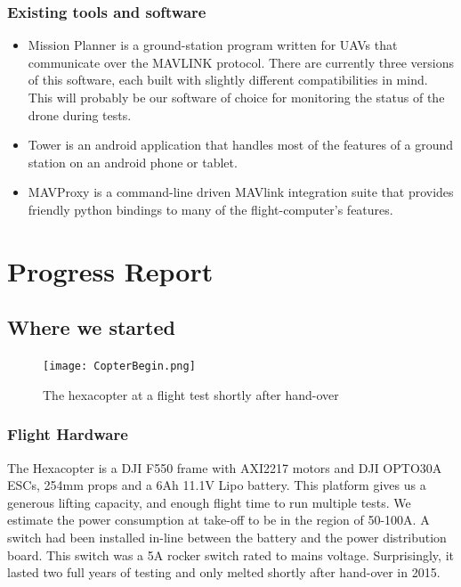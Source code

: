 \documentclass[a4paper, 11pt, titlepage]{article}
\begin{document}
    \subsubsection{Existing tools and software}
    \begin{itemize}
      \item Mission Planner\cite{MPlanner} is a ground-station program written for UAVs that communicate over the MAVLINK protocol.  There are currently three versions of this software, each built with slightly different compatibilities in mind.  This will probably be our software of choice for monitoring the status of the drone during tests.
      \item Tower \cite{3dr-tower} is an android application that handles most of the features of a ground station on an android phone or tablet.
      \item MAVProxy \cite{MAVProxy} is a command-line driven MAVlink integration suite that provides friendly python bindings to many of the flight-computer's features.


      \end{itemize}

  \section{Progress Report}
  \subsection{Where we started}
      \begin{figure}[h!]
        \centering
        \texttt{[image: CopterBegin.png]}
        \caption{The hexacopter at a flight test shortly after hand-over}
      \end{figure}
    \subsubsection{Flight Hardware}
      The Hexacopter is a DJI F550 frame with AXI2217 motors and DJI OPTO30A ESCs, 254mm props and a 6Ah 11.1V Lipo battery.
      This platform gives us a generous lifting capacity, and enough flight time to run multiple tests.
      We estimate the power consumption at take-off to be in the region of 50-100A.  A switch had been installed in-line between the battery and the power distribution board. This switch was a 5A rocker switch rated to mains voltage.  Surprisingly, it lasted two full years of testing and only melted shortly after hand-over in 2015.
\end{document}
